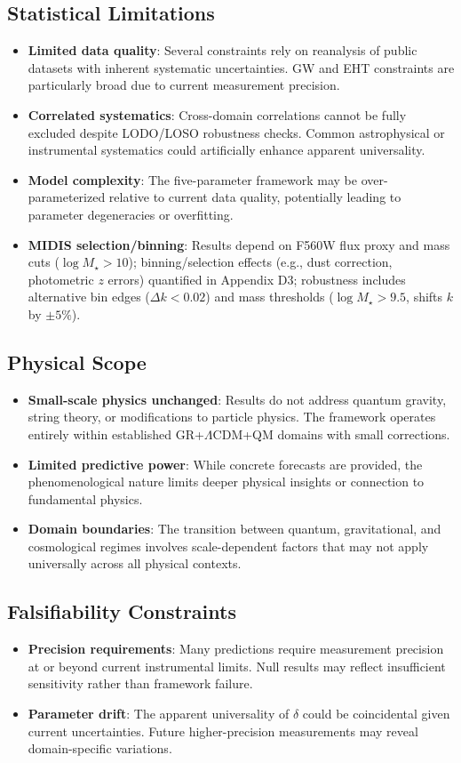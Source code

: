 \subsection{Statistical Limitations}
\begin{itemize}
\item \textbf{Limited data quality}: Several constraints rely on reanalysis of public datasets with inherent systematic uncertainties. GW and EHT constraints are particularly broad due to current measurement precision.
\item \textbf{Correlated systematics}: Cross-domain correlations cannot be fully excluded despite LODO/LOSO robustness checks. Common astrophysical or instrumental systematics could artificially enhance apparent universality.
\item \textbf{Model complexity}: The five-parameter framework may be over-parameterized relative to current data quality, potentially leading to parameter degeneracies or overfitting.
\item \textbf{MIDIS selection/binning}: Results depend on F560W flux proxy and mass cuts ($\log M_\star > 10$); binning/selection effects (e.g., dust correction, photometric $z$ errors) quantified in Appendix D3; robustness includes alternative bin edges ($\Delta k < 0.02$) and mass thresholds ($\log M_\star > 9.5$, shifts $k$ by $\pm5\%$).
\end{itemize}

\subsection{Physical Scope}
\begin{itemize}
\item \textbf{Small-scale physics unchanged}: Results do not address quantum gravity, string theory, or modifications to particle physics. The framework operates entirely within established GR+$\Lambda$CDM+QM domains with small corrections.
\item \textbf{Limited predictive power}: While concrete forecasts are provided, the phenomenological nature limits deeper physical insights or connection to fundamental physics.
\item \textbf{Domain boundaries}: The transition between quantum, gravitational, and cosmological regimes involves scale-dependent factors that may not apply universally across all physical contexts.
\end{itemize}

\subsection{Falsifiability Constraints}
\begin{itemize}
\item \textbf{Precision requirements}: Many predictions require measurement precision at or beyond current instrumental limits. Null results may reflect insufficient sensitivity rather than framework failure.
\item \textbf{Parameter drift}: The apparent universality of $\delta$ could be coincidental given current uncertainties. Future higher-precision measurements may reveal domain-specific variations.
\end{itemize}

